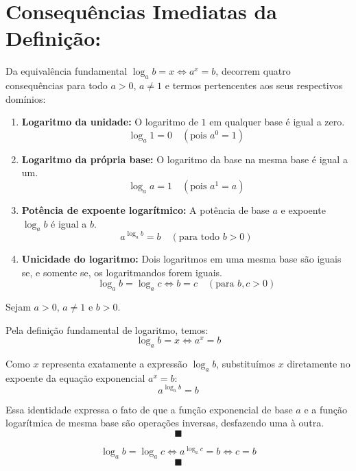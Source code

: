 \documentclass[12pt,a4paper]{report}
\begin{document}
	\section{Consequências Imediatas da Definição:}
	
	Da equivalência fundamental $\log_a b = x \iff a^x = b$, decorrem quatro consequências para todo $a > 0$, $a \neq 1$ e termos pertencentes aos seus respectivos domínios:
	
	\begin{destaque}[Consequências]
		\begin{enumerate}[label=\textbf{\arabic*.}]
			\item \textbf{Logaritmo da unidade:} O logaritmo de $1$ em qualquer base é igual a zero.
			$$\log_a 1 = 0 \quad (\text{pois } a^0 = 1)$$
			
			\item \textbf{Logaritmo da própria base:} O logaritmo da base na mesma base é igual a um.
			$$\log_a a = 1 \quad (\text{pois } a^1 = a)$$
			
			\item \textbf{Potência de expoente logarítmico:} A potência de base $a$ e expoente $\log_a b$ é igual a $b$.
			$$a^{\log_a b} = b \quad (\text{para todo } b > 0)$$
				
			\item \textbf{Unicidade do logaritmo:} Dois logaritmos em uma mesma base são iguais se, e somente se, os logaritmandos forem iguais.
			$$\log_a b = \log_a c \iff b = c \quad (\text{para } b, c > 0)$$		
			
		\end{enumerate}
	\end{destaque}

	\newpage
	
	\begin{destaque}
		Sejam $a > 0$, $a \neq 1$ e $b > 0$. 
		
		Pela definição fundamental de logaritmo, temos:
		$$\log_a b = x \iff a^x = b$$
		
		Como $x$ representa exatamente a expressão $\log_a b$, substituímos $x$ diretamente no expoente da equação exponencial $a^x = b$:
		$$a^{\log_a b} = b$$
		
		Essa identidade expressa o fato de que a função exponencial de base $a$ e a função logarítmica de mesma base são operações inversas, desfazendo uma à outra.
		$$\blacksquare$$
	\end{destaque}

		
	\begin{destaque}
		$$\log_a b = \log_a c \Longleftrightarrow a^{\log_a c} = b \Longleftrightarrow c=b$$
		$$\blacksquare$$
	\end{destaque}
	
\end{document}
